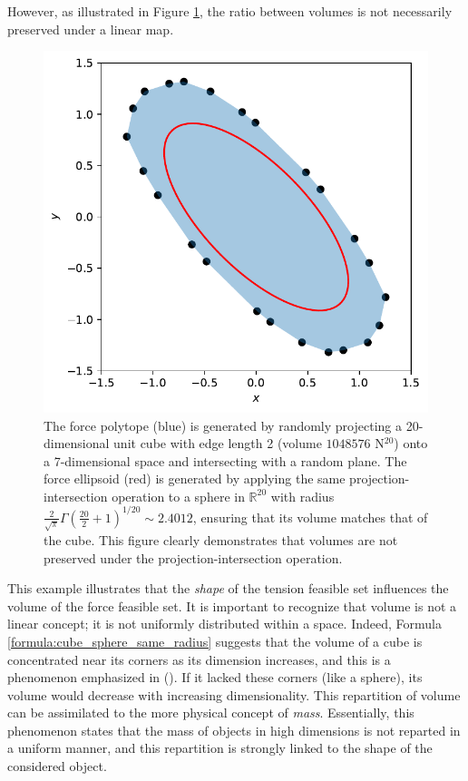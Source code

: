 However, as illustrated in Figure \ref{fig:ellipsoid_scale_same_volume}, the ratio between volumes is not necessarily preserved under a linear map.
\begin{figure}[!htb]
  \captionsetup{justification=centering}
    \centering
    \includegraphics[trim={0 0 0 0},clip, width=0.5\linewidth]{img/chapter_3/myIma4_projection_cube_sphere_same_volume.pdf}  
  \caption{The force polytope (blue) is generated by randomly projecting a 20-dimensional unit cube with edge length 2 (volume $1048576$ N$^{20}$) onto a 7-dimensional space and intersecting with a random plane.  The force ellipsoid (red) is generated by applying the same projection-intersection operation to a sphere in $\mathbb{R}^{20}$ with radius $\frac{2}{\sqrt{\pi}}\Gamma\left(\frac{20}{2}+1\right)^{1/20}\sim 2.4012$, ensuring that its volume matches that of the cube. This figure clearly demonstrates that volumes are not preserved under the projection-intersection operation.}
  \label{fig:ellipsoid_scale_same_volume}
\end{figure}

This example illustrates that the \emph{shape} of the tension feasible set influences the volume of the force feasible set. It is important to recognize that volume is not a linear concept; it is not uniformly distributed within a space. Indeed, Formula \ref{formula:cube_sphere_same_radius} suggests that the volume of a cube is concentrated near its corners as its dimension increases, and this is a phenomenon emphasized in (\cite{milmanAsymptoticTheoryFinite2001}). If it lacked these corners (like a sphere), its volume would decrease with increasing dimensionality. This repartition of volume can be assimilated to the more physical concept of \emph{mass}. Essentially, this phenomenon states that the mass of objects in high dimensions is not reparted in a uniform manner, and this repartition is strongly linked to the shape of the considered object.

